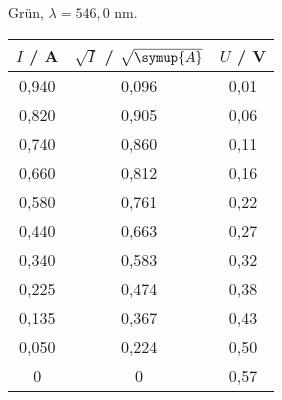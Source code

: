 \begin{subtable}{0.4\textwidth}
\centering
\caption{Grün, $\lambda = 546,0$ nm.} 
        \begin{tabular}{c c c}
            \toprule
            { $I$ / A} & {$\sqrt{I}$ / $\sqrt{\symup{A}}$} & {$U$ / V} \\
            \midrule
               0,940 & 0,096 & 0,01 \\
               0,820 & 0,905 & 0,06 \\
               0,740 & 0,860 & 0,11 \\
               0,660 & 0,812 & 0,16 \\
               0,580 & 0,761 & 0,22 \\
               0,440 & 0,663 & 0,27 \\
               0,340 & 0,583 & 0,32 \\
               0,225 & 0,474 & 0,38 \\
               0,135 & 0,367 & 0,43 \\
               0,050 & 0,224 & 0,50 \\
               0     & 0 & 0,57 \\
            \bottomrule
        \end{tabular}
        
        \end{subtable}
